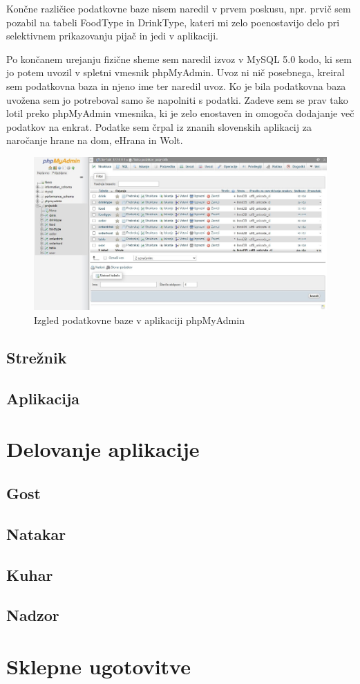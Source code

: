 \documentclass[a4paper, 12pt]{book}
\begin{document}
Končne različice podatkovne baze nisem naredil v prvem poskusu, npr. prvič sem pozabil na tabeli FoodType in DrinkType, kateri mi zelo poenostavijo delo pri selektivnem prikazovanju pijač in jedi v aplikaciji. 

Po končanem urejanju fizične sheme sem naredil izvoz v MySQL 5.0 kodo, ki sem jo potem uvozil v spletni vmesnik phpMyAdmin. Uvoz ni nič posebnega, kreiral sem podatkovna baza in njeno ime ter naredil uvoz. 
Ko je bila podatkovna baza uvožena sem jo potreboval samo še napolniti s podatki. Zadeve sem se prav tako lotil preko phpMyAdmin vmesnika, ki je zelo enostaven in omogoča dodajanje več podatkov na enkrat. Podatke sem črpal iz znanih slovenskih aplikacij za naročanje hrane na dom, eHrana in Wolt.
\begin{figure}[h]
\begin{center}
\includegraphics[width=14cm]{phpMyAdmin}
\end{center}
\caption{Izgled podatkovne baze v aplikaciji phpMyAdmin}
\label{phpMyAdmin}
\end{figure}

\section{Strežnik}

\section{Aplikacija}

\chapter {Delovanje aplikacije}
\section{Gost}
\section{Natakar}
\section{Kuhar}
\section{Nadzor}

\chapter {Sklepne ugotovitve}
\newpage %
\ \\
\clearpage
{}


\end{document}
